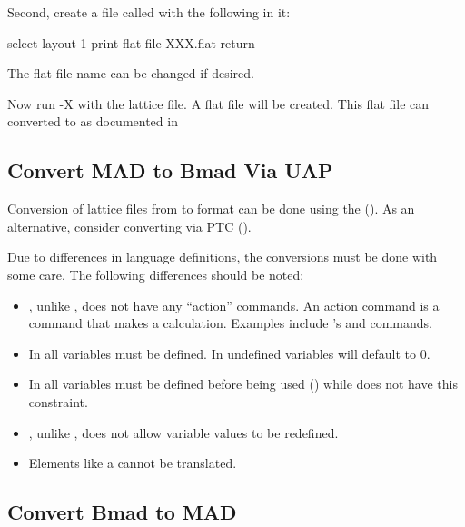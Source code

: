 Second, create a file called  with the following in it:
\begin{example}
  select layout
  1
  print flat file
  XXX.flat
  return
\end{example}
The flat file name  can be changed if desired.

Now run \mad-X with the lattice file. A flat file will be created. This flat file can
converted to \bmad as documented in 

\subsection{Convert MAD to Bmad Via UAP}
\label{s:mad.bmad.uap}

Conversion of lattice files from \mad to \bmad format can be done using the  (). As an alternative, consider converting via PTC
().

Due to differences in language definitions, the conversions must be done with some
care. The following differences should be noted:
  \begin{itemize}
  \item
\bmad, unlike \mad, does not have any ``action'' commands. An action
command is a command that makes a calculation. Examples include \mad's
 and  commands.
  \item
In \bmad all variables must be defined. In \mad undefined variables
will default to 0.
  \item
In \bmad all variables must be defined before being used
() while \mad does not have this constraint.
  \item
\bmad, unlike \mad, does not allow variable values to be redefined.
  \item
Elements like a  cannot be translated.
  \end{itemize}

\subsection{Convert Bmad to MAD}
\label{s:mad.bmad.uap}


